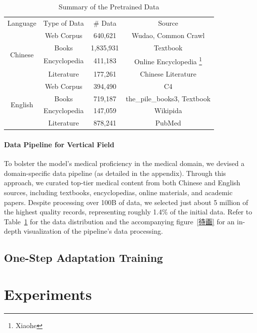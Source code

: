 \documentclass{article} %
\begin{document}
\begin{table}[h]
\centering
\begin{tabular}{|c|c|c|c|}
\hline
\multirow{2}{*}{Language} & \multirow{2}{*}{Type of Data} & \multirow{2}{*}{\# Data} & \multirow{2}{*}{Source} \\
& & & \\
\hline
\multirow{4}{*}{Chinese} & Web Corpus & 640,621 & Wudao, Common Crawl \\
\cline{2-4}
& Books & 1,835,931 & Textbook \\
\cline{2-4}
& Encyclopedia & 411,183 & Online Encyclopedia \footnote{Xiaohe} \\
\cline{2-4}
& Literature & 177,261 & Chinese Literature \\
\hline
\multirow{4}{*}{English} & Web Corpus & 394,490 & C4 \\
\cline{2-4}
& Books & 719,187 & the\_pile\_books3, Textbook \\
\cline{2-4}
& Encyclopedia & 147,059 & Wikipida \\
\cline{2-4}
& Literature & 878,241 & PubMed \\
\hline
\end{tabular}
\caption{\label{tab:pretrained data} Summary of the Pretrained Data}
\end{table}

\paragraph{Data Pipeline for Vertical Field}
To bolster the model's medical proficiency in the medical domain, we devised a domain-specific data pipeline (as detailed in the appendix).  Through this approach, we curated top-tier medical content from both Chinese and English sources, including textbooks, encyclopedias, online materials, and academic papers. Despite processing over 100B of data, we selected just about 5 million of the highest quality records, representing roughly 1.4\% of the initial data. Refer to Table~\ref{tab:pretrained data} for the data distribution and the accompanying figure~\ref{待画} for an in-depth visualization of the pipeline's data processing.


\subsection{One-Step Adaptation Training}



\section{Experiments}
\end{document}
